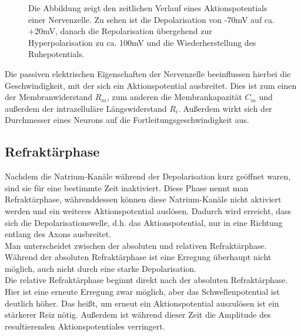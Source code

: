 \documentclass[11pt]{article}
\begin{document}
\begin{figure}[H]
\caption{Die Abbildung zeigt den zeitlichen Verlauf eines Aktionspotentials einer Nervenzelle. Zu sehen ist die Depolarisation von -70mV auf ca. +20mV, danach die Repolarisation übergehend zur Hyperpolarisation zu ca. 100mV und die Wiederherstellung des Ruhepotentials.  }
\label{ap}
\end{figure}

Die passiven elektrischen Eigenschaften der Nervenzelle beeinflussen hierbei die Geschwindigkeit, mit der sich ein Aktionspotential ausbreitet. Dies ist zum einen der Membranwiderstand $R_m$, zum anderen die Membrankapazität $C_m$ und außerdem der intrazelluläre Längswiderstand $R_i$. Außerdem wirkt sich der Durchmesser eines Neurons auf die Fortleitungsgeschwindigkeit aus.  \cite{haustiere} 

\subsection{Refraktärphase}\label{refraktär}
Nachdem die Natrium-Kanäle während der Depolarisation kurz geöffnet waren, sind sie für eine bestimmte Zeit inaktiviert. Diese Phase nennt man Refraktärphase, währenddessen können diese Natrium-Kanäle nicht aktiviert werden und ein weiteres Aktionspotential auslösen. Dadurch wird erreicht, dass sich die Depolarisationswelle, d.h. das Aktionspotential, nur in eine Richtung entlang des Axons ausbreitet.  \cite{zellbiologie} \\
Man unterscheidet zwischen der absoluten und relativen Refraktärphase. Während der absoluten Refraktärphase ist eine Erregung überhaupt nicht möglich, auch nicht durch eine starke Depolarisation. \\
Die relative Refraktärphase beginnt direkt nach der absoluten Refraktärphase. Hier ist eine erneute Erregung zwar möglich, aber das Schwellenpotential ist deutlich höher. Das heißt, um erneut ein Aktionspotential auszulösen ist ein stärkerer Reiz nötig. Außerdem ist während dieser Zeit die Amplitude des resultierenden Aktionspotentiales verringert. \cite{physiologie}
\end{document}
